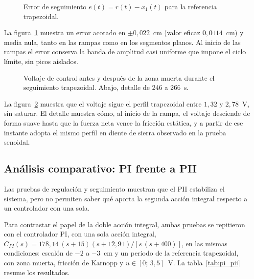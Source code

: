 \begin{figure}[ht]
    \centering
    
    \caption[Seguimiento trapezoidal: error]{Error de seguimiento $e(t)=r(t)-x_1(t)$ para la referencia trapezoidal.}
    \label{fig:trap_error}
\end{figure}

La figura~\ref{fig:trap_error} muestra un error acotado en $\pm 0{,}022$~cm (valor eficaz $0{,}0114$~cm) y media nula, tanto en las rampas como en los segmentos planos. Al inicio de las rampas el error conserva la banda de amplitud casi uniforme que impone el ciclo límite, sin picos aislados.

\FloatBarrier

\begin{figure}[ht]
    \centering
    
    \caption[Seguimiento trapezoidal: señal de control]{Voltaje de control antes y después de la zona muerta durante el seguimiento trapezoidal. Abajo, detalle de 246 a 266~s.}
    \label{fig:trap_ctrl}
\end{figure}

La figura~\ref{fig:trap_ctrl} muestra que el voltaje sigue el perfil trapezoidal entre $1{,}32$ y $2{,}78$~V, sin saturar. El detalle muestra cómo, al inicio de la rampa, el voltaje desciende de forma suave hasta que la fuerza neta vence la fricción estática, y a partir de ese instante adopta el mismo perfil en diente de sierra observado en la prueba senoidal.

\FloatBarrier

\subsection{Análisis comparativo: PI frente a PII}

Las pruebas de regulación y seguimiento muestran que el PII estabiliza el sistema, pero no permiten saber qué aporta la segunda acción integral respecto a un controlador con una sola.

Para contrastar el papel de la doble acción integral, ambas pruebas se repitieron con el controlador PI, con una sola acción integral, $C_{PI}(s)=178{,}14\,(s+15)(s+12{,}91)/[s\,(s+400)]$, en las mismas condiciones: escalón de $-2$ a $-3$~cm y un periodo de la referencia trapezoidal, con zona muerta, fricción de Karnopp y $u\in[0;\,3{,}5]$~V. La tabla~\ref{tab:pi_pii} resume los resultados.

